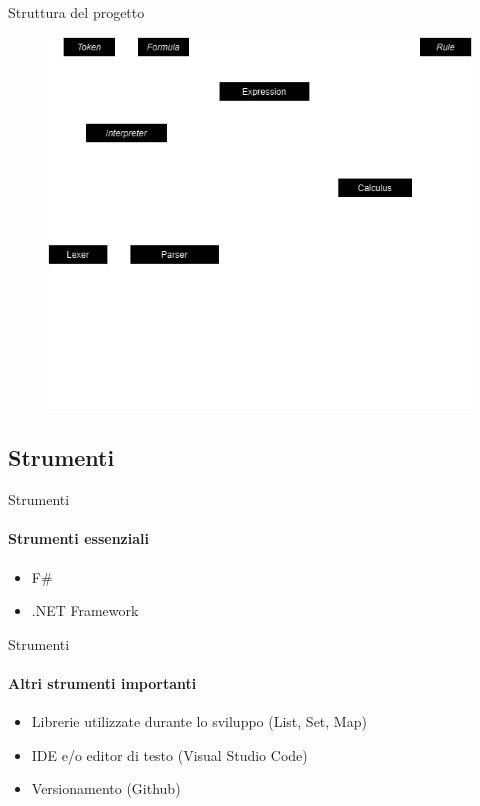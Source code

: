 \documentclass{beamer}
\begin{document}
\begin{darkframes}
    \begin{frame}{Struttura del progetto}
        \begin{figure}[h]
            \includegraphics[scale=0.4]{../images/composizione.drawio.png}
        \end{figure}
    \end{frame}

    \subsection{Strumenti}
    \begin{frame}{Strumenti}
        \framesubtitle{Strumenti essenziali}
        \begin{itemize}
            \item F\#
            \item .NET Framework
        \end{itemize}
    \end{frame}

    \begin{frame}{Strumenti}
        \framesubtitle{Altri strumenti importanti}
        \begin{itemize}
            \item Librerie utilizzate durante lo sviluppo (List, Set, Map)
            \item IDE e/o editor di testo (Visual Studio Code)
            \item Versionamento (Github)
        \end{itemize}
    \end{frame}


\end{darkframes}
\end{document}
